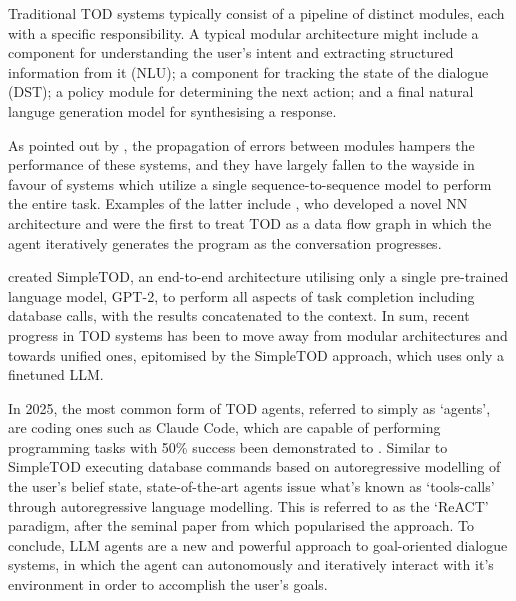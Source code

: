 \documentclass[11pt]{article}
\begin{document}
Traditional TOD systems typically consist of a pipeline of distinct modules, each with a specific responsibility.
A typical modular architecture might include a component for understanding the user's intent and extracting structured information from it (NLU); a component for tracking the state of the dialogue (DST); a policy module for determining the next action; and a final natural languge generation model for synthesising a response.  

As pointed out by \citet{yi_survey_2025}, the propagation of errors between modules hampers the performance of these systems, and they have largely fallen to the wayside in favour of systems which utilize a single sequence-to-sequence model to perform the entire task.
Examples of the latter include \citet{wen_network-based_2017}, who developed a novel NN architecture and \citet{andreas_task-oriented_2020} were the first to treat TOD as a data flow graph in which the agent iteratively generates the program as the conversation progresses.

\citet{hosseini-asl_simple_2022} created SimpleTOD, an end-to-end architecture utilising only a single pre-trained language model, GPT-2, to perform all aspects of task completion including database calls, with the results concatenated to the context.
In sum, recent progress in TOD systems has been to move away from modular architectures and towards unified ones, epitomised by the SimpleTOD approach, which uses only a finetuned LLM. 


In 2025, the most common form of TOD agents, referred to simply as `agents', are coding ones such as Claude Code, which are capable of performing programming tasks with 50\% success 
been demonstrated to \cite{kwa_measuring_2025}.
Similar to SimpleTOD executing database commands based on autoregressive modelling of the user's belief state, state-of-the-art agents issue what's known as `tools-calls' through autoregressive language modelling. This is referred to as the `ReACT' paradigm, after the seminal paper from \citet{yao_reac_2023} which popularised the approach. To conclude, LLM agents are a new and powerful approach to goal-oriented dialogue systems, in which the agent can autonomously and iteratively interact with it's environment in order to accomplish the user's goals.
\end{document}
